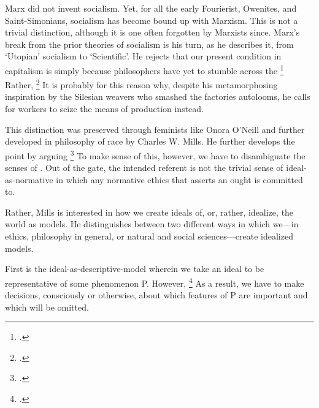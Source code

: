 \documentclass[letterpaper,notitlepage,12pt]{article}
\begin{document}
Marx did not invent socialism.
Yet, for all the early Fourierist, Owenites, and Saint-Simonians, socialism has
become bound up with Marxism.
This is not a trivial distinction, although it is one often forgotten by
Marxists since.
Marx's break from the prior theories of socialism is his turn, as he describes
it, from `Utopian' socialism to `Scientific'.
He rejects that our present condition in capitalism is simply because
philosophers have yet to stumble across the \footcite{engels_socialism:_1978}
Rather, \footcite{marx_german_200}
It is probably for this reason why, despite his metamorphosing inspiration by 
the Silesian weavers who smashed the factories autolooms, he calls for workers 
to seize the means of production instead.

This distinction was preserved through feminists like Onora O'Neill and further
developed in philosophy of race by Charles W. Mills.
He further develops the point by arguing \footcite[p. 166]{mills_ideal_2005}
To make sense of this, however, we have to disambiguate the senses of
.
Out of the gate, the intended referent is not the trivial sense of
ideal-as-normative in which any normative ethics that asserts an ought is
committed to.

Rather, Mills is interested in how we create ideals of, or, rather, idealize,
the world as models.
He distinguishes between two different ways in which we---in ethics, philosophy
in general, or natural and social sciences---create idealized models.

First is the ideal-as-descriptive-model wherein we take an ideal to be
representative of some phenomenon P.
However, \footcite[p. 166]{mills_ideal_2005}
As a result, we have to make decisions, consciously or otherwise, about which 
features of P are important and which will be omitted.
\end{document}

